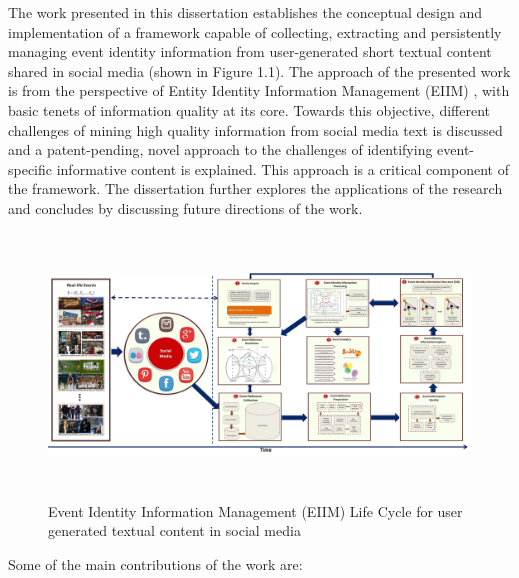 The work presented in this dissertation establishes the conceptual design and implementation of a framework capable of collecting, extracting and persistently managing event identity information from user-generated short textual content shared in social media (shown in Figure 1.1). The approach of the presented work is from the perspective of Entity Identity Information Management (EIIM) \cite{zhou2011entity}, with basic tenets of information quality at its core. Towards this objective, different challenges of mining high quality information from social media text is discussed and a patent-pending, novel approach to the challenges of identifying event-specific informative content is explained. This approach is a critical component of the framework. The dissertation further explores the applications of the research and concludes by discussing future directions of the work.



\begin{figure}[htbp]
\label{eiim}
  \caption{Event Identity Information Management (EIIM) Life Cycle for user generated textual content in social media}
  \centering
    \includegraphics[width=15cm,height=7cm]{Figures/EIIMpic.jpg}
\end{figure}

Some of the main contributions of the work are:

